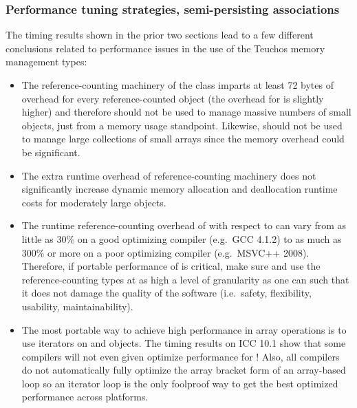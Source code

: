 \documentclass[pdf,ps2pdf,11pt]{SANDreport}
\begin{document}
%
{}\subsubsection{Performance tuning strategies, semi-persisting associations}
\label{sec:perf-tuning-strategies}
%

The timing results shown in the prior two sections lead to a few
different conclusions related to performance issues in the use of the
Teuchos memory management types:

\begin{itemize}

{}\item The reference-counting machinery of the {} class
imparts at least 72 bytes of overhead for every reference-counted
object (the overhead for {} is slightly higher) and
therefore {} should not be used to manage massive numbers of
small objects, just from a memory usage standpoint.  Likewise,
{} should not be used to manage large collections of
small arrays since the memory overhead could be significant.

{}\item The extra runtime overhead of reference-counting machinery
does not significantly increase dynamic memory allocation and
deallocation runtime costs for moderately large objects.

{}\item The runtime reference-counting overhead of {} with
respect to {} can vary from as little as 30\%
on a good optimizing compiler (e.g.\ GCC 4.1.2) to as much as 300\% or
more on a poor optimizing compiler (e.g.\ MSVC++ 2008).  Therefore, if
portable performance of is critical, make sure and use the
reference-counting types at as high a level of granularity as one can
such that it does not damage the quality of the software (i.e.\
safety, flexibility, usability, maintainability).

{}\item The most portable way to achieve high performance in array
operations is to use iterators on {}\ttt{ArrayRCP} and
{} objects.  The timing results on ICC 10.1 show that
some compilers will not even given optimize performance for
{}!  Also, all compilers do not
automatically fully optimize the array bracket form of an array-based
loop so an iterator loop is the only foolproof way to get the best
optimized performance across platforms.

\end{itemize}
\end{document}
